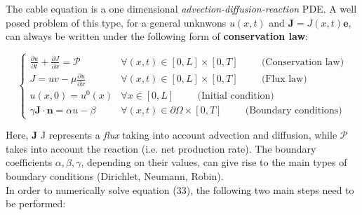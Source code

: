\documentclass[a4paper]{article}
\begin{document}
The cable equation is a one dimensional \textit{advection-diffusion-reaction} PDE. A well posed problem of this type, for a general unknwons $ u(x,t)$ and $\textbf{J} = J(x,t)\textbf{e}$, can always be written under the following form of \textbf{conservation law}:


\begin{equation}
\begin{cases}
\frac{\partial u}{\partial t} +\frac{\partial J}{\partial x} = \mathcal{P} & \forall (x,t) \in [0,L] \times [0,T] \hspace{1cm} \text{(Conservation law)} \\
J = u v - \mu \frac{\partial u}{\partial x} & \forall (x,t) \in [0,L] \times [0,T] \hspace{1cm} \text{(Flux law)}\\
u(x,0) = u^0(x) & \forall x \in [0,L] \hspace{1cm}  \text{(Initial condition)} \\
\gamma \textbf{J} \cdot \textbf{n} = \alpha u - \beta &  \forall (x,t) \in \partial \Omega \times [0,T] \hspace{1cm} \text{(Boundary conditions)}
\end{cases}
\end{equation}

Here, $\textbf{J}$ J represents a \textit{flux} taking into account advection and diffusion, while $\mathcal{P}$ takes into account the reaction (i.e. net production rate). The boundary coefficients $\alpha, \beta, \gamma$, depending on their values, can give rise to the main types of boundary conditions (Dirichlet, Neumann, Robin).\\
In order to numerically solve equation (33), the following two main steps need to be performed:
\end{document}
